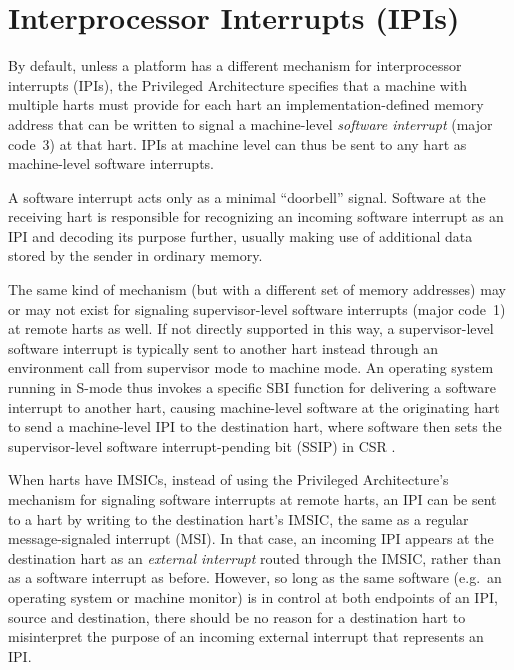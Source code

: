 
\chapter{Interprocessor Interrupts (IPIs)}
\label{ch:IPIs}

By default, unless a platform has a different mechanism for
interprocessor interrupts (IPIs), the {\RISCV} Privileged Architecture
specifies that a machine with multiple harts must provide for each hart
an implementation-defined memory address that can be written to signal
a machine-level \emph{software interrupt} (major code~3) at that hart.
IPIs at machine level can thus be sent to any hart as machine-level
software interrupts.

\begin{commentary}
A {\RISCV} software interrupt acts only as a minimal ``doorbell''
signal.
Software at the receiving hart is responsible for recognizing an
incoming software interrupt as an IPI and decoding its purpose further,
usually making use of additional data stored by the sender in ordinary
memory.
\end{commentary}

The same kind of mechanism (but with a different set of memory addresses) may
or may not exist for signaling supervisor-level software interrupts
(major code~1) at remote harts as well.
If not directly supported in this way, a supervisor-level software
interrupt is typically sent to another hart instead through an environment call
from supervisor mode to machine mode.
An operating system running in \mbox{S-mode} thus invokes a specific
SBI function for delivering a software interrupt to another hart,
causing machine-level software at the originating hart to send a
machine-level IPI to the destination hart, where software then sets the
supervisor-level software interrupt-pending bit (SSIP) in CSR .

When harts have IMSICs, instead of using the Privileged Architecture's
mechanism for signaling software interrupts at remote harts, an IPI
can be sent to a hart by writing to the destination hart's IMSIC, the
same as a regular message-signaled interrupt (MSI)\@.
In that case, an incoming IPI appears at the destination hart as an
\emph{external interrupt} routed through the IMSIC, rather than as a
software interrupt as before.
However, so long as the same software (e.g.\ an operating system or
machine monitor) is in control at both endpoints of an IPI, source
and destination, there should be no reason for a destination hart
to misinterpret the purpose of an incoming external interrupt that
represents an IPI.


